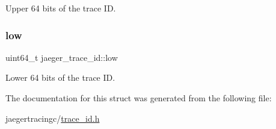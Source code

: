 Upper 64 bits of the trace ID. 

\mbox{\label{structjaeger__trace__id_af6a2c57fe8c53b8a1dbe114a757ab3b7}} 
\subsubsection{\texorpdfstring{low}{low}}
{\footnotesize\ttfamily uint64\+\_\+t jaeger\+\_\+trace\+\_\+id\+::low}



Lower 64 bits of the trace ID. 



The documentation for this struct was generated from the following file\+:\begin{DoxyCompactItemize}
\item 
jaegertracingc/\mbox{\hyperlink{trace__id_8h}{trace\+\_\+id.\+h}}\end{DoxyCompactItemize}
